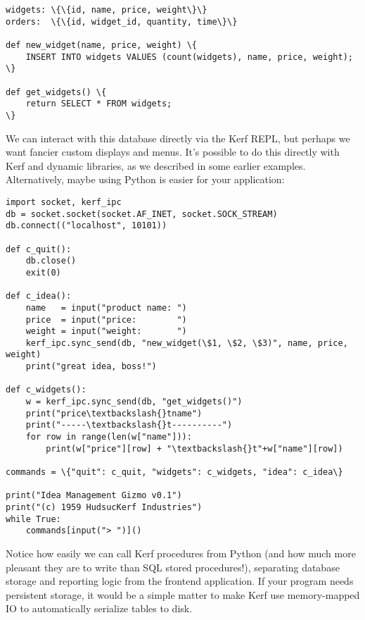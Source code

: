\documentclass{article}
\begin{document}
\begin{Verbatim}
widgets: \{\{id, name, price, weight\}\}
orders:  \{\{id, widget_id, quantity, time\}\}

def new_widget(name, price, weight) \{
	INSERT INTO widgets VALUES (count(widgets), name, price, weight);
\}

def get_widgets() \{
	return SELECT * FROM widgets;
\}
\end{Verbatim}

We can interact with this database directly via the Kerf REPL, but perhaps we want fancier custom displays and menus. It's possible to do this directly with Kerf and dynamic libraries, as we described in some earlier examples. Alternatively, maybe using Python is easier for your application:

\begin{Verbatim}
import socket, kerf_ipc
db = socket.socket(socket.AF_INET, socket.SOCK_STREAM)
db.connect(("localhost", 10101))

def c_quit():
	db.close()
	exit(0)

def c_idea():
	name   = input("product name: ")
	price  = input("price:        ")
	weight = input("weight:       ")
	kerf_ipc.sync_send(db, "new_widget(\$1, \$2, \$3)", name, price, weight)
	print("great idea, boss!")

def c_widgets():
	w = kerf_ipc.sync_send(db, "get_widgets()")
	print("price\textbackslash{}tname")
	print("-----\textbackslash{}t----------")
	for row in range(len(w["name"])):
		print(w["price"][row] + "\textbackslash{}t"+w["name"][row])

commands = \{"quit": c_quit, "widgets": c_widgets, "idea": c_idea\}

print("Idea Management Gizmo v0.1")
print("(c) 1959 HudsucKerf Industries")
while True:
	commands[input("> ")]()
\end{Verbatim}

Notice how easily we can call Kerf procedures from Python (and how much more pleasant they are to write than SQL stored procedures!), separating database storage and reporting logic from the frontend application. If your program needs persistent storage, it would be a simple matter to make Kerf use memory-mapped IO to automatically serialize tables to disk.
\end{document}
